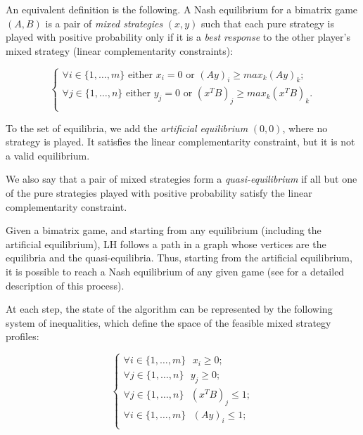 \documentclass[11pt]{article}
\begin{document}
An equivalent definition is the following. A Nash equilibrium for a
bimatrix game $(A,B)$ is a pair of {\em mixed strategies} $(x,y)$
such that each pure strategy is played with positive probability
only if it is a {\em best response} to the other player's mixed
strategy (linear complementarity constraints):

\begin{equation*}
\left\{
\begin{array}{cc}
\forall i \in \{1,\dots,m\} \text{ either } x_i=0 \text{ or } (A y)_i
\ge max_k (A y)_k ;\\
\forall j \in \{1,\dots,n\} \text{ either } y_j=0 \text{ or } (x^T
B)_j \ge max_k (x^T B)_k .\\
\end{array}
\right.
\end{equation*}

To the set of equilibria, we add the {\em artificial equilibrium}
$(0,0)$, where no strategy is played. It satisfies the linear
complementarity constraint, but it is not a valid equilibrium.


We also say that a pair of mixed strategies form a {\em
quasi-equilibrium} if all but one of the pure strategies played with
positive probability satisfy the linear complementarity constraint.

Given a bimatrix game, and starting from any equilibrium (including
the artificial equilibrium), LH follows a path in a graph whose
vertices are the equilibria and the quasi-equilibria. Thus, starting
from the artificial equilibrium, it is possible to reach a Nash
equilibrium of any given game (see \cite{vstengel} for a detailed
description of this process).

At each step, the state of the algorithm can be represented by the
following system of inequalities, which define the space of the
feasible mixed strategy profiles:

\begin{equation*}
\left\{
\begin{array}{cccc}
\forall i \in \{1,\dots,m\} \text{ } x_i \ge 0 ;\\
\forall j \in \{1,\dots,n\} \text{ } y_j \ge 0 ;\\
\forall j \in \{1,\dots,n\} \text{ } (x^T B)_j \le 1 ;\\
\forall i \in \{1,\dots,m\} \text{ } (A y)_i \le 1 ;\\
\end{array}
\right.
\end{equation*}
\end{document}
